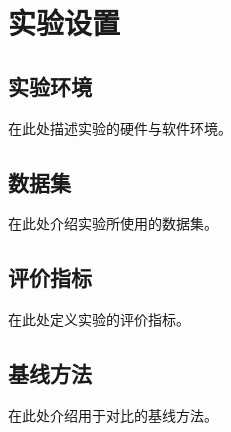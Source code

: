 
\chapter{实验设置}

\section{实验环境}

在此处描述实验的硬件与软件环境。

\section{数据集}

在此处介绍实验所使用的数据集。

\section{评价指标}

在此处定义实验的评价指标。

\section{基线方法}

在此处介绍用于对比的基线方法。
